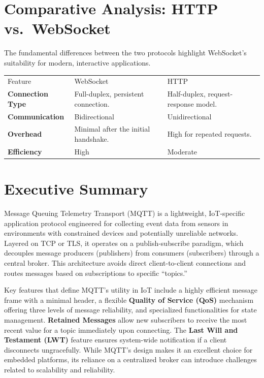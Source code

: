 \documentclass[a4paper, 12pt]{book} %
\begin{document}
\section{Comparative Analysis: HTTP
vs.~WebSocket}\label{comparative-analysis-http-vs.-websocket}

The fundamental differences between the two protocols highlight
WebSocket's suitability for modern, interactive applications.

\begin{longtable}[]{@{}
  >{\raggedright\arraybackslash}p{}
  >{\raggedright\arraybackslash}p{}
  >{\raggedright\arraybackslash}p{}@{}}
\toprule\noalign{}
\endhead
\bottomrule\noalign{}
\endlastfoot
Feature & WebSocket & HTTP \\
\textbf{Connection Type} & Full-duplex, persistent connection. &
Half-duplex, request-response model. \\
\textbf{Communication} & Bidirectional & Unidirectional \\
\textbf{Overhead} & Minimal after the initial handshake. & High for
repeated requests. \\
\textbf{Efficiency} & High & Moderate \\
\end{longtable}


\section{Executive Summary}\label{executive-summary}

Message Queuing Telemetry Transport (MQTT) is a lightweight,
IoT-specific application protocol engineered for collecting event data
from sensors in environments with constrained devices and potentially
unreliable networks. Layered on TCP or TLS, it operates on a
publish-subscribe paradigm, which decouples message producers
(publishers) from consumers (subscribers) through a central broker. This
architecture avoids direct client-to-client connections and routes
messages based on subscriptions to specific ``topics.''

Key features that define MQTT's utility in IoT include a highly
efficient message frame with a minimal header, a flexible
\textbf{Quality of Service (QoS)} mechanism offering three levels of
message reliability, and specialized functionalities for state
management. \textbf{Retained Messages} allow new subscribers to receive
the most recent value for a topic immediately upon connecting. The
\textbf{Last Will and Testament (LWT)} feature ensures system-wide
notification if a client disconnects ungracefully. While MQTT's design
makes it an excellent choice for embedded platforms, its reliance on a
centralized broker can introduce challenges related to scalability and
reliability.
\end{document}
